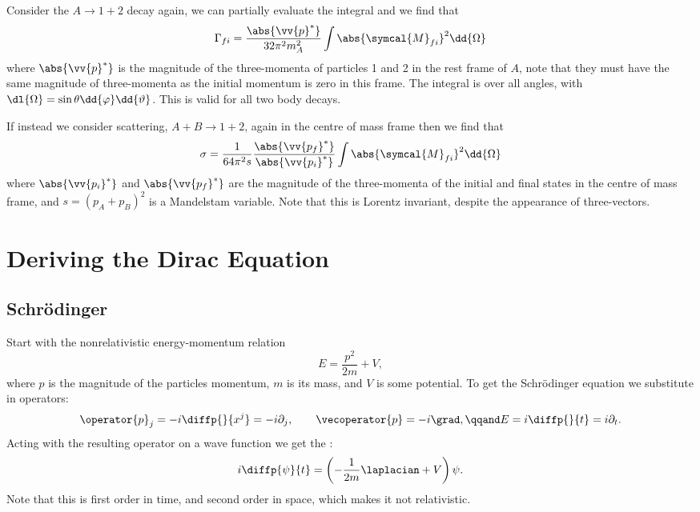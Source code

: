 \documentclass[fleqn]{NotesClass}
\newcommand{\amplitude}{\symcal{M}}
\begin{document}
    Consider the \(A \to 1 + 2\) decay again, we can partially evaluate the integral and we find that
    \begin{equation}
        \Gamma_{fi} = \frac{\abs{\vv{p}^*}}{32\pi^2 m_A^2} \int \abs{\amplitude_{fi}}^2 \dd{\Omega}
    \end{equation}
    where \(\abs{\vv{p}^*}\) is the magnitude of the three-momenta of particles 1 and 2 in the rest frame of \(A\), note that they must have the same magnitude of three-momenta as the initial momentum is zero in this frame.
    The integral is over all angles, with \(\dl{\Omega} = \sin\theta \dd{\varphi} \dd{\vartheta}\).
    This is valid for all two body decays.
    
    If instead we consider scattering, \(A + B \to 1 + 2\), again in the centre of mass frame then we find that
    \begin{equation}
        \sigma = \frac{1}{64\pi^2s} \frac{\abs{\vv{p_f}^*}}{\abs{\vv{p_i}^*}} \int \abs{\amplitude_{fi}}^2 \dd{\Omega}
    \end{equation}
    where \(\abs{\vv{p_i}^*}\) and \(\abs{\vv{p_f}^*}\) are the magnitude of the three-momenta of the initial and final states in the centre of mass frame, and \(s = (p_A + p_B)^2\) is a Mandelstam variable.
    Note that this is Lorentz invariant, despite the appearance of three-vectors.
    
    \chapter{Deriving the Dirac Equation}
    \section{Schrödinger}
    Start with the nonrelativistic energy-momentum relation
    \begin{equation}
        E = \frac{p^2}{2m} + V,
    \end{equation}
    where \(p\) is the magnitude of the particles momentum, \(m\) is its mass, and \(V\) is some potential.
    To get the Schrödinger equation we substitute in operators:
    \begin{equation}
        \operator{p}_j = -i\diffp{}{x^j} = -i\partial_j, \qquad \vecoperator{p} = -i\grad, \qqand E = i\diffp{}{t} = i\partial_t.
    \end{equation}
    Acting with the resulting operator on a wave function we get the :
    \begin{equation}
        i\diffp{\psi}{t} = \left( -\frac{1}{2m} \laplacian + V \right)\psi.
    \end{equation}
    Note that this is first order in time, and second order in space, which makes it not relativistic.
    
\end{document}

